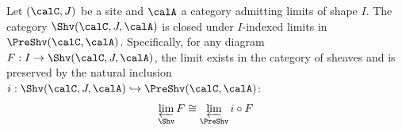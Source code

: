 \begin{definition} \label{definition:limit_in_a_sheaf_category}
    Let $(\calC, J)$ be a site and $\calA$ a category admitting limits of shape $I$. The category $\Shv(\calC, J, \calA)$ is closed under $I$-indexed limits in $\PreShv(\calC, \calA)$. Specifically, for any diagram $F: I \to \Shv(\calC, J, \calA)$, the limit exists in the category of sheaves and is preserved by the natural inclusion $i: \Shv(\calC, J, \calA) \hookrightarrow \PreShv(\calC, \calA)$:
    \[ \varprojlim_{\Shv} F \cong \varprojlim_{\PreShv} i \circ F \]
\end{definition}